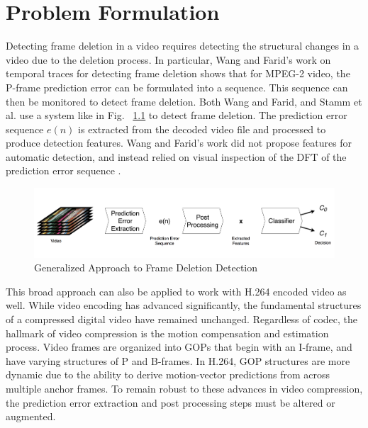 \chapter{Problem Formulation}

Detecting frame deletion in a video requires detecting the structural changes in a video due to the deletion process. In particular, Wang and Farid's work on temporal traces for detecting frame deletion shows that for MPEG-2 video, the P-frame prediction error can be formulated into a sequence. This sequence can then be monitored to detect frame deletion. Both Wang and Farid, and Stamm et al. use a system like in Fig. ~\ref{System} to detect frame deletion. The prediction error sequence $e(n)$ is extracted from the decoded video file and processed to produce detection features. Wang and Farid's work did not propose features for automatic detection, and instead relied on visual inspection of the DFT of the prediction error sequence \cite{wang} \cite{stamm}.

\begin{figure}[htbp]
\centerline{\includegraphics[width=0.9\linewidth]{ProblemFormulation/frame_deletion_detection_system.png}}
\caption{Generalized Approach to Frame Deletion Detection}
\label{System}
\end{figure}

This broad approach can also be applied to work with H.264 encoded video as well. While video encoding has advanced significantly, the fundamental structures of a compressed digital video have remained unchanged. Regardless of codec, the hallmark of video compression is the motion compensation and estimation process. Video frames are organized into GOPs that begin with an I-frame, and have varying structures of P and B-frames. In H.264, GOP structures are more dynamic due to the ability to derive motion-vector predictions from across multiple anchor frames. To remain robust to these advances in video compression, the prediction error extraction and post processing steps must be altered or augmented.

